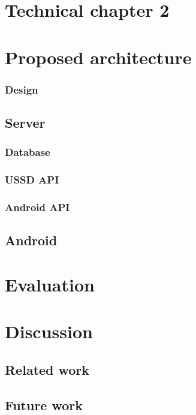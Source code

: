 \documentclass[11pt, a4paper]{article}
\begin{document}
\section{Technical chapter 2}

\section{Proposed architecture}
\subsubsection{Design}
\subsection{Server} %

\subsubsection{Database}
\subsubsection{USSD API}
\subsubsection{Android API}
\subsection{Android}

\section{Evaluation}
\section{Discussion}
\subsection{Related work} %
\label{sub:related_work}

\subsection{Future work} %
\label{sub:future_work}

\end{document}
